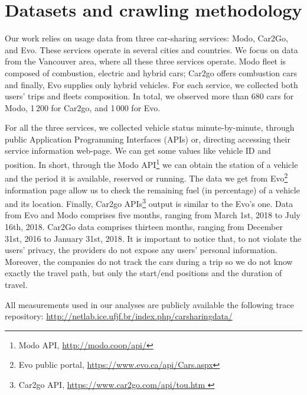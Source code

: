 \section{Datasets and crawling methodology} 
\label{sec:3_4_methodology}

Our work relies on usage data from three car-sharing services: Modo, Car2Go, and Evo. These services operate in several cities and countries. We focus on data from the Vancouver area, where all these three services operate. Modo fleet is composed of combustion, electric and hybrid cars; Car2go offers combustion cars and finally, Evo supplies only hybrid vehicles. For each service, we collected both users' trips and fleets composition. In total, we observed more than 680 cars for Modo, 1\,200 for Car2go, and 1\,000 for Evo.

For all the three services, we collected vehicle status minute-by-minute, through public Application Programming Interfaces (APIs) or, directing accessing their service information web-page. We can get some values like vehicle ID and position.  In short, through the Modo API\footnote{Modo API, \url{http://modo.coop/api/}} we can obtain the station of a vehicle and the period it is available, reserved or running.
The data we get from Evo\footnote{Evo public portal, \url{https://www.evo.ca/api/Cars.aspx}} information page allow us to check the remaining fuel  (in percentage) of a vehicle and its location. Finally, Car2go APIs\footnote{Car2go API, \url{https://www.car2go.com/api/tou.htm }} output is similar to the Evo's one. 
Data from Evo and Modo comprises five months, ranging from March 1st, 2018 to July 16th, 2018. Car2Go data comprises thirteen months, ranging from  December 31st, 2016 to January 31st, 2018. It is important to notice that, to not violate the users' privacy, the providers do not expose any users' personal information. Moreover, the companies do not track the cars during a trip so we do not know exactly the travel path, but only the start/end positions and the duration of travel.

All measurements used in our analyses are publicly available the following trace repository:
\url{http://netlab.ice.ufjf.br/index.php/carsharingdata/}




